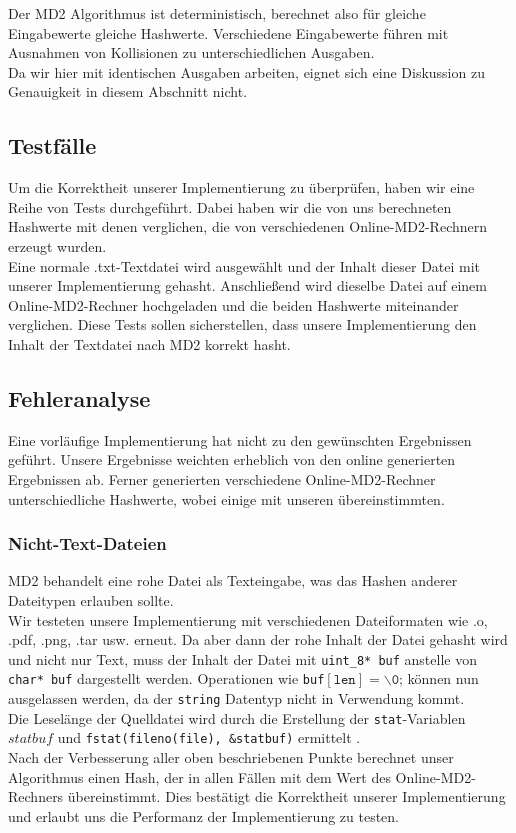 Der MD2 Algorithmus ist deterministisch, berechnet also für gleiche Eingabewerte 
gleiche Hashwerte.
Verschiedene Eingabewerte führen mit Ausnahmen von Kollisionen
zu unterschiedlichen Ausgaben.
\\
Da wir hier mit identischen Ausgaben arbeiten, eignet sich eine Diskussion zu 
Genauigkeit in diesem Abschnitt nicht.

\subsection{Testfälle}
Um die Korrektheit unserer Implementierung zu überprüfen, haben wir eine Reihe von Tests
durchgeführt.
Dabei haben wir die von uns berechneten Hashwerte mit denen verglichen, die von verschiedenen
Online-MD2-Rechnern\cite{hashcalculator} erzeugt wurden.
\\
Eine normale .txt-Textdatei wird ausgewählt und der Inhalt dieser Datei
mit unserer Implementierung gehasht.
Anschließend wird dieselbe Datei auf einem Online-MD2-Rechner hochgeladen und
die beiden Hashwerte miteinander verglichen.
Diese Tests sollen sicherstellen, dass unsere Implementierung den Inhalt der
Textdatei nach MD2
korrekt hasht.

\subsection{Fehleranalyse}
Eine vorläufige Implementierung hat nicht zu den gewünschten Ergebnissen geführt.
Unsere Ergebnisse weichten erheblich von den online generierten Ergebnissen ab.
Ferner generierten verschiedene Online-MD2-Rechner unterschiedliche Hashwerte, 
wobei einige mit unseren übereinstimmten.

\subsubsection{Nicht-Text-Dateien}
MD2 behandelt eine rohe Datei als Texteingabe, was das Hashen anderer Dateitypen 
erlauben sollte.
\\
Wir testeten unsere Implementierung mit verschiedenen Dateiformaten wie .o, 
.pdf, .png, .tar usw.
erneut.
Da aber dann der rohe Inhalt der Datei gehasht wird und nicht nur Text, muss der Inhalt der Datei
mit \texttt{uint\_8* buf} anstelle von \texttt{char* buf} dargestellt werden.
Operationen wie \texttt{buf}$[\texttt{len}] = \backslash\texttt{0;}$ können nun 
ausgelassen werden, da der \texttt{string} Datentyp nicht in Verwendung kommt.
\\
Die Leselänge der Quelldatei wird durch die Erstellung der \texttt{stat}-Variablen $statbuf$
und \texttt{fstat(fileno(file), \&statbuf)} ermittelt \cite{fileIO}.
\\
Nach der Verbesserung aller oben beschriebenen Punkte berechnet unser Algorithmus einen
Hash, der in allen Fällen mit dem Wert des Online-MD2-Rechners übereinstimmt.
Dies bestätigt die Korrektheit unserer Implementierung und erlaubt uns die Performanz 
der Implementierung zu testen.
